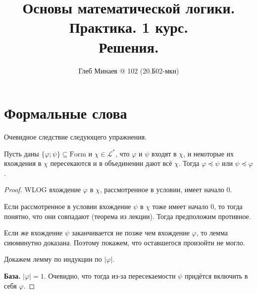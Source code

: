 \documentclass[12pt,a4paper]{article}
\title{Основы математической логики.\\ Практика. 1 курс.\\Решения.}
\author{Глеб Минаев @ 102 (20.Б02-мкн)}
\newcommand{\Formul}{\ensuremath{\mathrm{Form}}\xspace}
\begin{document}
    \maketitle


    \section{Формальные слова}

    \begin{enumproblem}
        Очевидное следствие следующего упражнения.
    \end{enumproblem}

    \begin{enumproblem}
        \begin{lemma}
            Пусть даны $\{\varphi; \psi\} \subseteq \Formul$ и $\chi \in \mathscr{L}^*$, что $\varphi$ и $\psi$ входят в $\chi$, и некоторые их вхождения в $\chi$ пересекаются и в объединении дают всё $\chi$. Тогда $\varphi \preccurlyeq \psi$ или $\psi \preccurlyeq \varphi$.
        \end{lemma}

        \begin{proof}
            WLOG вхождение $\varphi$ в $\chi$, рассмотренное в условии, имеет начало $0$.

            Если рассмотренное в условии вхождение $\psi$ в $\chi$ тоже имеет начало $0$, то тогда понятно, что они совпадают (теорема из лекции). Тогда предположим противное.

            Если же вхождение $\psi$ заканчивается не позже чем вхождение $\varphi$, то лемма сиюминутно доказана. Поэтому покажем, что оставшегося произойти не могло.
            
            Докажем лемму по индукции по $|\varphi|$.

            \textbf{База.} $|\varphi| = 1$. Очевидно, что тогда из-за пересекаемости $\psi$ придётся включить в себя $\varphi$.


\end{proof}
\end{enumproblem}
\end{document}
